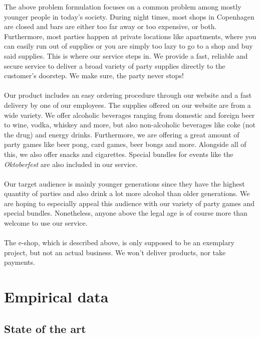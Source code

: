 \documentclass[12p]{article}
\begin{document}
The above problem formulation focuses on a common problem among mostly younger people in today's society. During night times, most shops in Copenhagen are closed and bars are either too far away or too expensive, or both. Furthermore, most parties happen at private locations like apartments, where you can easily run out of supplies or you are simply too lazy to go to a shop and buy said supplies. This is where our service steps in. We provide a fast, reliable and secure service to deliver a broad variety of party supplies directly to the customer's doorstep. We make sure, the party never stops! 
\\ \\
Our product includes an easy ordering procedure through our website and a fast delivery by one of our employees. The supplies offered on our website are from a wide variety. We offer alcoholic beverages ranging from domestic and foreign beer to wine, vodka, whiskey and more, but also non-alcoholic beverages like coke (not the drug) and energy drinks. Furthermore, we are offering a great amount of party games like beer pong, card games, beer bongs and more. Alongside all of this, we also offer snacks and cigarettes. Special bundles for events like the \emph{Oktoberfest} are also included in our service.
\\ \\
Our target audience is mainly younger generations since they have the highest quantity of parties and also drink a lot more alcohol than older generations. We are hoping to especially appeal this audience with our variety of party games and special bundles. Nonetheless, anyone above the legal age is of course more than welcome to use our service.
\\ \\
The e-shop, which is described above, is only supposed to be an exemplary project, but not an actual business. We won't deliver products, nor take payments.


\newpage
\section{Empirical data}


\subsection{State of the art}
\end{document}
